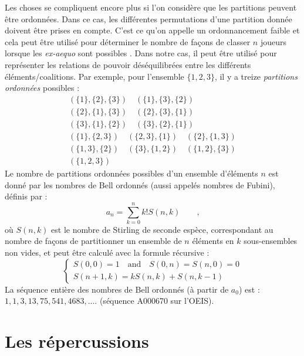Les choses se compliquent encore plus si l'on considère que les partitions peuvent être ordonnées. Dans ce cas, les différentes permutations d'une partition donnée doivent être prises en compte. C'est ce qu'on appelle un ordonnancement faible et cela peut être utilisé pour déterminer le nombre de façons de classer $n$ joueurs lorsque les \emph{ex-aequo} sont possibles \cite{Good1975}. Dans notre cas, il peut être utilisé pour représenter les relations de pouvoir déséquilibrées entre les différents éléments/coalitions. Par exemple, pour l'ensemble $\{1,2,3\}$, il y a treize \emph{partitions ordonnées} possibles :
\begin{gather*}
(\{1\},\{2\},\{3\}) \quad (\{1\},\{3\},\{2\}) \\ 
(\{2\},\{1\},\{3\}) \quad (\{2\},\{3\},\{1\}) \\ 
(\{3\},\{1\},\{2\}) \quad (\{3\},\{2\},\{1\}) \\
(\{1\},\{2,3\}) \quad (\{2,3\},\{1\}) \quad (\{2\},\{1,3\}) \\
(\{1,3\},\{2\}) \quad (\{3\},\{1,2\}) \quad (\{1,2\},\{3\}) \\
(\{1,2,3\})
\end{gather*}
Le nombre de partitions ordonnées possibles d'un ensemble d'éléments $n$ est donné par les nombres de Bell ordonnés (aussi appelés nombres de Fubini), définis par \cite{Knuth1998} :
\begin{equation}
     a_n= \sum\limits_{k=0}^n k ! S(n,k) \quad \quad \text{,}
\end{equation}
où $S(n,k)$ est le nombre de Stirling de seconde espèce, correspondant au nombre de façons de partitionner un ensemble de $n$ éléments en $k$ sous-ensembles non vides, et peut être calculé avec la formule récursive \cite{Graham1988} :
\begin{equation}
    \begin{cases}
    S(0,0) = 1 \quad \text{and} \quad S(0,n) = S(n,0) = 0\\
    S(n+1,k) = kS(n,k) + S(n,k-1)
    \end{cases}
\end{equation}
La séquence entière des nombres de Bell ordonnés (à partir de $a_0$) est : $1, 1, 3, 13, 75, 541, 4683, ....$ (séquence A000670 sur l'OEIS).

\section*{Les répercussions}

